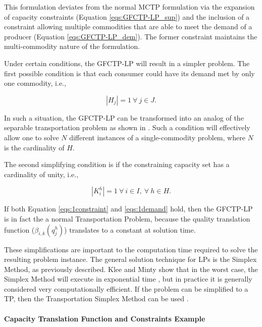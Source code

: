 This formulation deviates from the normal MCTP formulation via the expansion of
capacity constraints (Equation \ref{eqs:GFCTP-LP_sup}) and the inclusion of a
constraint allowing multiple commodities that are able to meet the demand of a
producer (Equation \ref{eqs:GFCTP-LP_dem}). The former constraint maintains the
multi-commodity nature of the formulation. 

Under certain conditions, the GFCTP-LP will result in a simpler problem. The
first possible condition is that each consumer could have its demand met by only
one commodity, i.e.,

\begin{equation}\label{eqs:1demand}
  \left|{H_{j}}\right| = 1 \: \forall \: j \in J.
\end{equation}

In such a situation, the GFCTP-LP can be transformed into an analog of the
separable transportation problem as shown in \cite{bertsekas_network_1998}. Such
a condition will effectively allow one to solve $N$ different instances of a
single-commodity problem, where $N$ is the cardinality of $H$. 

The second simplifying condition is if the constraining capacity set has a
cardinality of unity, i.e., 

\begin{equation}\label{eqs:1constraint}
  \left|{K_{i}^{h}}\right| = 1 \: \forall \: i \in I, \: \forall \: h \in H.
\end{equation}

If both Equation \ref{eqs:1constraint} and \ref{eqs:1demand} hold, then the
GFCTP-LP is in fact the a normal Transportation Problem, because the quality
translation function ($\beta_{i,k}(q_{j}^{h})$) translates to a constant at
solution time. 

These simplifications are important to the computation time required to solve
the resulting problem instance. The general solution technique for LPs is the
Simplex Method, as previously described. Klee and Minty show that in the worst
case, the Simplex Method will execute in exponential time \cite{klee_good_1970},
but in practice it is generally considered very computationally efficient. If
the problem can be simplified to a TP, then the Transportation Simplex Method
can be used \cite{ahuja_network_1993}.

\paragraph{Capacity Translation Function and Constraints Example}

